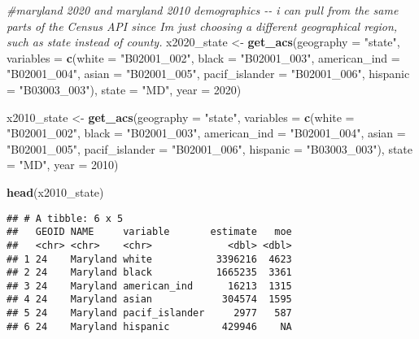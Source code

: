 \documentclass[
]{article}
\newenvironment{Shaded}{\begin{snugshade}}{\end{snugshade}}
\newcommand{\AttributeTok}[1]{\textcolor[rgb]{0.13,0.29,0.53}{#1}}
\newcommand{\CommentTok}[1]{\textcolor[rgb]{0.56,0.35,0.01}{\textit{#1}}}
\newcommand{\DecValTok}[1]{\textcolor[rgb]{0.00,0.00,0.81}{#1}}
\newcommand{\FunctionTok}[1]{\textcolor[rgb]{0.13,0.29,0.53}{\textbf{#1}}}
\newcommand{\NormalTok}[1]{#1}
\newcommand{\OtherTok}[1]{\textcolor[rgb]{0.56,0.35,0.01}{#1}}
\newcommand{\StringTok}[1]{\textcolor[rgb]{0.31,0.60,0.02}{#1}}
\begin{document}
\begin{Shaded}
\begin{Highlighting}[]
\CommentTok{\#maryland 2020 and maryland 2010 demographics {-}{-} i can pull from the same parts of the Census API since I\textquotesingle{}m just choosing a different geographical region, such as state instead of county. }
\NormalTok{x2020\_state }\OtherTok{\textless{}{-}} \FunctionTok{get\_acs}\NormalTok{(}\AttributeTok{geography =} \StringTok{"state"}\NormalTok{,}
              \AttributeTok{variables =} \FunctionTok{c}\NormalTok{(}\AttributeTok{white =} \StringTok{"B02001\_002"}\NormalTok{, }
                            \AttributeTok{black =} \StringTok{"B02001\_003"}\NormalTok{,}
                            \AttributeTok{american\_ind =} \StringTok{"B02001\_004"}\NormalTok{,}
                            \AttributeTok{asian =} \StringTok{"B02001\_005"}\NormalTok{,}
                            \AttributeTok{pacif\_islander =} \StringTok{"B02001\_006"}\NormalTok{,}
                            \AttributeTok{hispanic =} \StringTok{"B03003\_003"}\NormalTok{),}
              \AttributeTok{state =} \StringTok{"MD"}\NormalTok{,}
              \AttributeTok{year =} \DecValTok{2020}\NormalTok{) }

\NormalTok{x2010\_state }\OtherTok{\textless{}{-}} \FunctionTok{get\_acs}\NormalTok{(}\AttributeTok{geography =} \StringTok{"state"}\NormalTok{,}
              \AttributeTok{variables =} \FunctionTok{c}\NormalTok{(}\AttributeTok{white =} \StringTok{"B02001\_002"}\NormalTok{, }
                            \AttributeTok{black =} \StringTok{"B02001\_003"}\NormalTok{,}
                            \AttributeTok{american\_ind =} \StringTok{"B02001\_004"}\NormalTok{,}
                            \AttributeTok{asian =} \StringTok{"B02001\_005"}\NormalTok{,}
                            \AttributeTok{pacif\_islander =} \StringTok{"B02001\_006"}\NormalTok{,}
                            \AttributeTok{hispanic =} \StringTok{"B03003\_003"}\NormalTok{),}
              \AttributeTok{state =} \StringTok{"MD"}\NormalTok{,}
              \AttributeTok{year =} \DecValTok{2010}\NormalTok{) }

\FunctionTok{head}\NormalTok{(x2010\_state)}
\end{Highlighting}
\end{Shaded}

\begin{verbatim}
## # A tibble: 6 x 5
##   GEOID NAME     variable       estimate   moe
##   <chr> <chr>    <chr>             <dbl> <dbl>
## 1 24    Maryland white           3396216  4623
## 2 24    Maryland black           1665235  3361
## 3 24    Maryland american_ind      16213  1315
## 4 24    Maryland asian            304574  1595
## 5 24    Maryland pacif_islander     2977   587
## 6 24    Maryland hispanic         429946    NA
\end{verbatim}
\end{document}
